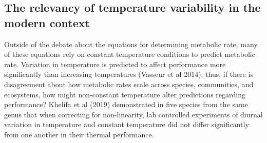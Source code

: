 \documentclass[12pt,twoside]{reedthesis}
\begin{document}
\hypertarget{the-relevancy-of-temperature-variability-in-the-modern-context}{%
\subsection{The relevancy of temperature variability in the modern context}\label{the-relevancy-of-temperature-variability-in-the-modern-context}}

Outside of the debate about the equations for determining metabolic rate, many of these equations rely on constant temperature conditions to predict metabolic rate. Variation in temperature is predicted to affect performance more significantly than increasing temperatures (Vasseur et al 2014); thus, if there is disagreement about how metabolic rates scale across species, communities, and ecosystems, how might non-constant temperature alter predictions regarding performance? Khelifa et al (2019) demonstrated in five species from the same genus that when correcting for non-linearity, lab controlled experiments of diurnal variation in temperature and constant temperature did not differ significantly from one another in their thermal performance.
\end{document}
